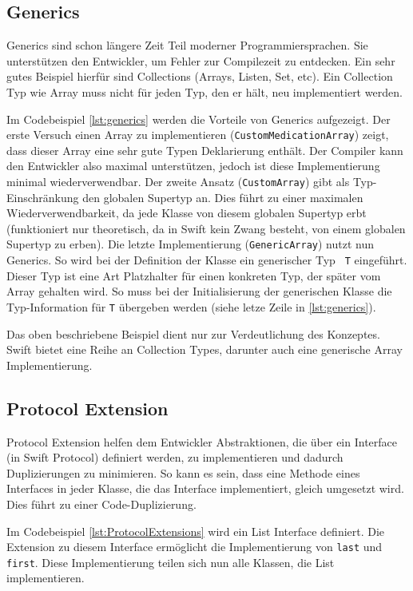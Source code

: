 \subsection*{Generics}
Generics sind schon längere Zeit Teil moderner Programmiersprachen. Sie unterstützen den Entwickler, um Fehler zur Compilezeit zu entdecken. Ein sehr gutes Beispiel hierfür sind Collections (Arrays, Listen, Set, etc). Ein Collection Typ wie Array muss nicht für jeden Typ, den er hält, neu implementiert werden.

Im Codebeispiel \ref{lst:generics} werden die Vorteile von Generics aufgezeigt. Der erste Versuch einen Array zu implementieren (\lstinline{CustomMedicationArray}) zeigt, dass dieser Array eine sehr gute Typen Deklarierung enthält. Der Compiler kann den Entwickler also maximal unterstützen, jedoch ist diese Implementierung minimal wiederverwendbar. Der zweite Ansatz (\lstinline{CustomArray}) gibt als Typ-Einschränkung den globalen Supertyp an. Dies führt zu einer maximalen Wiederverwendbarkeit, da jede Klasse von diesem globalen Supertyp erbt (funktioniert nur theoretisch, da in Swift kein Zwang besteht, von einem globalen Supertyp zu erben).
Die letzte Implementierung (\lstinline{GenericArray}) nutzt nun Generics. So wird bei der Definition der Klasse ein generischer Typ \lstinline{ T}  eingeführt. Dieser Typ ist eine Art Platzhalter für einen konkreten Typ, der später vom Array gehalten wird. So muss bei der Initialisierung der generischen Klasse die Typ-Information für \lstinline{T} übergeben werden (siehe letze Zeile in \ref{lst:generics}).

Das oben beschriebene Beispiel dient nur zur Verdeutlichung des Konzeptes. Swift bietet eine Reihe an Collection Types, darunter auch eine generische Array Implementierung. 

\subsection*{Protocol Extension}
Protocol Extension helfen dem Entwickler Abstraktionen, die über ein Interface (in Swift Protocol) definiert werden, zu implementieren und dadurch Duplizierungen zu minimieren. So kann es sein, dass eine Methode eines Interfaces in jeder Klasse, die das Interface implementiert, gleich umgesetzt wird. Dies führt zu einer Code-Duplizierung. 

Im Codebeispiel \ref{lst:ProtocolExtensions} wird ein List Interface definiert. Die Extension zu diesem Interface ermöglicht die Implementierung von \lstinline{last}  und \lstinline{first}. Diese Implementierung teilen sich nun alle Klassen, die List implementieren.

